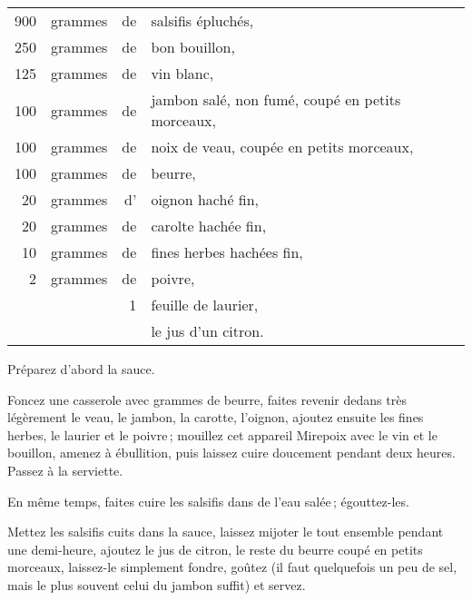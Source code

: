 \footnotesize
\begin{longtable}{rrrp{16em}}
    900 & grammes & de & salsifis épluchés,                                                               \\
    250 & grammes & de & bon bouillon,                                                                    \\
    125 & grammes & de & vin blanc,                                                                       \\
    100 & grammes & de & jambon salé, non fumé, coupé en petits morceaux,                                 \\
    100 & grammes & de & noix de veau, coupée en petits morceaux,                                         \\
    100 & grammes & de & beurre,                                                                          \\
     20 & grammes & d' & oignon haché fin,                                                                \\
     20 & grammes & de & carolte hachée fin,                                                              \\
     10 & grammes & de & fines herbes hachées fin,                                                        \\
      2 & grammes & de & poivre,                                                                          \\
        &         &  1 & feuille de laurier,                                                              \\
        &         &    & le jus d'un citron.                                                              \\
\end{longtable}
\normalsize

Préparez d'abord la sauce.

Foncez une casserole avec {\mmm} grammes de beurre, faites revenir dedans
très légèrement le veau, le jambon, la carotte, l'oignon, ajoutez ensuite les
fines herbes, le laurier et le poivre ; mouillez cet appareil Mirepoix avec le
vin et le bouillon, amenez à ébullition, puis laissez cuire doucement pendant
deux heures. Passez à la serviette.

En même temps, faites cuire les salsifis dans de l'eau salée ; égouttez-les.

Mettez les salsifis cuits dans la sauce, laissez mijoter le tout ensemble
pendant une demi-heure, ajoutez le jus de citron, le reste du beurre coupé en
petits morceaux, laissez-le simplement fondre, goûtez (il faut quelquefois un
peu de sel, mais le plus souvent celui du jambon suffit) et servez.

